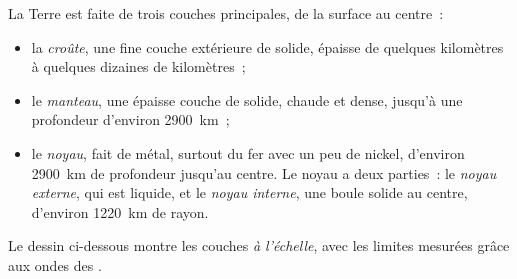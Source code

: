 \begin{definition}\label{def:g6:inside-the-earth:layers}
La Terre est faite de trois couches principales, de la surface au centre~:
\begin{itemize}
  \item la \emph{croûte}, une fine couche extérieure
        de  solide, épaisse de quelques kilomètres à quelques dizaines
        de kilomètres~;
  \item le \emph{manteau}, une épaisse couche de 
        solide, chaude et dense, jusqu'à une profondeur d'environ 2900~km~;
  \item le \emph{noyau}, fait de métal, surtout du fer avec un
        peu de nickel, d'environ 2900~km de profondeur jusqu'au centre. Le
        noyau a deux parties~: le \emph{noyau externe},
        qui est liquide, et le \emph{noyau interne},
        une boule solide au centre, d'environ 1220~km de rayon.
\end{itemize}
\end{definition}

Le dessin ci-dessous montre les couches \emph{à l'échelle}, avec les
limites mesurées grâce aux ondes des .

